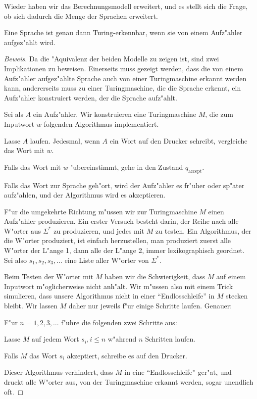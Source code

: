 Wieder haben wir das Berechnungsmodell erweitert, und es stellt sich
die Frage, ob sich dadurch die Menge der Sprachen erweitert.

\begin{satz}
Eine Sprache ist genau dann Turing-erkennbar, wenn sie
von einem Aufz"ahler aufgez"ahlt wird.\end{satz}

\begin{proof}[Beweis]
Da die "Aquivalenz der beiden Modelle zu zeigen ist, sind zwei Implikationen
zu beweisen. Einerseits muss gezeigt werden, dass die von einem
Aufz"ahler aufgez"ahlte Sprache auch von einer Turingmaschine
erkannt werden kann, andererseits muss zu einer Turingmaschine, die
die Sprache erkennt, ein Aufz"ahler konstruiert werden, der die Sprache
aufz"ahlt.

Sei als $A$ ein Aufz"ahler. Wir konstruieren eine Turingmaschine $M$, die
zum Inputwort $w$ folgenden Algorithmus implementiert.
\begin{compactenum}
\item Lasse $A$ laufen. Jedesmal, wenn $A$ ein Wort auf den Drucker schreibt,
vergleiche das Wort mit $w$.
\item Falls das Wort mit $w$ "ubereinstimmt, gehe in den Zustand
$q_{\text{accept}}$.
\end{compactenum}
Falls das Wort zur Sprache geh"ort, wird der Aufz"ahler es fr"uher
oder sp"ater aufz"ahlen, und der Algorithmus wird es akzeptieren.

F"ur die umgekehrte Richtung m"ussen wir zur Turingmaschine $M$
einen Aufz"ahler produzieren.
Ein erster Versuch besteht darin, der Reihe nach alle W"orter aus
$\Sigma^*$ zu produzieren, und jedes mit $M$ zu testen.
Ein Algorithmus, der die W"orter produziert, ist einfach herzustellen,
man produziert zuerst alle W"orter der L"ange 1, dann alle der L"ange 2,
immer lexikographisch geordnet.
Sei also $s_1,s_2,s_3,\dots$ eine Liste aller W"orter von $\Sigma^*$.

Beim Testen der W"orter mit $M$
haben wir die Schwierigkeit, dass $M$ auf einem Inputwort
m"oglicherweise nicht anh"alt. Wir m"ussen also mit einem Trick
simulieren, dass unsere Algorithmus nicht in einer ``Endlosschleife''
in $M$ stecken bleibt. Wir lassen $M$ daher nur jeweils f"ur einige
Schritte laufen.
Genauer:
\begin{compactenum}
\item F"ur $n=1,2,3,\dots$ f"uhre die folgenden zwei Schritte aus:
\item Lasse $M$ auf jedem Wort $s_i, i \le n$ w"ahrend $n$ Schritten
laufen.
\item Falls $M$ das Wort $s_i$ akzeptiert, schreibe es auf den Drucker.
\end{compactenum}
Dieser Algorithmus verhindert, dass $M$ in eine ``Endlosschleife''
ger"at, und druckt alle W"orter aus, von der Turingmaschine erkannt
werden, sogar unendlich oft.
\end{proof}

